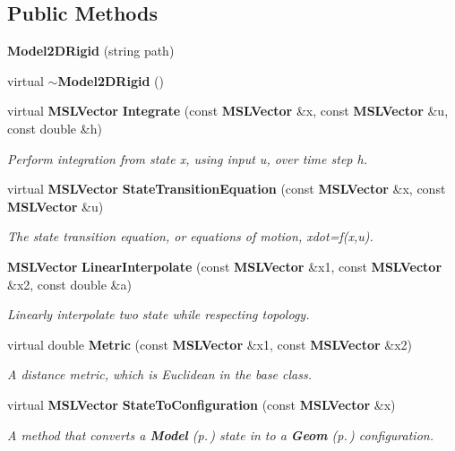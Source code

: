 \subsection*{Public Methods}
\begin{CompactItemize}
\item 
{\bf Model2DRigid} (string path)
\item 
virtual {\bf $\sim$Model2DRigid} ()
\item 
virtual {\bf MSLVector} {\bf Integrate} (const {\bf MSLVector} \&x, const {\bf MSLVector} \&u, const double \&h)
\begin{CompactList}\small\item\em Perform integration from state x, using input u, over time step h.\item\end{CompactList}\item 
virtual {\bf MSLVector} {\bf State\-Transition\-Equation} (const {\bf MSLVector} \&x, const {\bf MSLVector} \&u)
\begin{CompactList}\small\item\em The state transition equation, or equations of motion, xdot=f(x,u).\item\end{CompactList}\item 
{\bf MSLVector} {\bf Linear\-Interpolate} (const {\bf MSLVector} \&x1, const {\bf MSLVector} \&x2, const double \&a)
\begin{CompactList}\small\item\em Linearly interpolate two state while respecting topology.\item\end{CompactList}\item 
virtual double {\bf Metric} (const {\bf MSLVector} \&x1, const {\bf MSLVector} \&x2)
\begin{CompactList}\small\item\em A distance metric, which is Euclidean in the base class.\item\end{CompactList}\item 
virtual {\bf MSLVector} {\bf State\-To\-Configuration} (const {\bf MSLVector} \&x)
\begin{CompactList}\small\item\em A method that converts a {\bf Model} {\rm (p.\,\pageref{class_Model})} state in to a {\bf Geom} {\rm (p.\,\pageref{class_Geom})} configuration.\item\end{CompactList}\end{CompactItemize}



